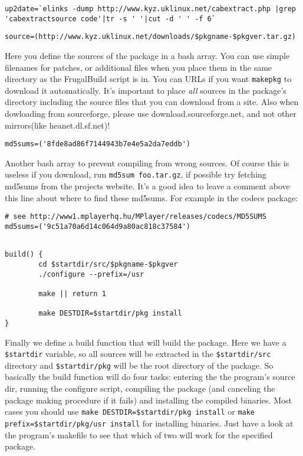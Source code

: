 \begin{verbatim}
up2date=`elinks -dump http://www.kyz.uklinux.net/cabextract.php |grep 'cabextractsource code'|tr -s ' '|cut -d ' ' -f 6`
\end{verbatim}

\begin{verbatim}
source=(http://www.kyz.uklinux.net/downloads/$pkgname-$pkgver.tar.gz)
\end{verbatim}

Here you define the sources of the package in a bash array. You can use simple filenames for patches, or additional files when you place them in the same directory as the FrugalBuild script is in. You can URLs if you want {\tt makepkg} to download it automatically. It's important to place \textit{all} sources in the package's directory including the source files that you can download from a site.
Also when dowloading from sourceforge, please use download.sourceforge.net, and not other mirrors(like
heanet.dl.sf.net)!

\begin{verbatim}
md5sums=('8fde8ad86f7144943b7e4e5a2da7eddb')
\end{verbatim}

Another bash array to prevent compiling from wrong sources. Of course this is useless if you download, run {\tt md5sum foo.tar.gz}, if possible try fetching md5sums from the projects website. It's a good idea to leave a comment above this line about where to find these md5sums. For example in the codecs package:

\begin{verbatim}
# see http://www1.mplayerhq.hu/MPlayer/releases/codecs/MD5SUMS
md5sums=('9c51a70a6d14c064d9a80ac818c37584')
\end{verbatim}

\begin{verbatim}

build() {
        cd $startdir/src/$pkgname-$pkgver
        ./configure --prefix=/usr
	
        make || return 1
	
        make DESTDIR=$startdir/pkg install
}
\end{verbatim}

Finally we define a build function that will build the package. Here we have a {\tt \$startdir} variable, so all sources will be extracted in the {\tt \$startdir/src} directory and {\tt \$startdir/pkg} will be the root directory of the package. So basically the build function will do four tasks: entering the the program's source dir, running the configure script, compiling the package (and canceling the package making procedure if it fails) and installing the compiled binaries. Most cases you should use {\tt make DESTDIR=\$startdir/pkg install} or {\tt make prefix=\$startdir/pkg/usr install} for installing binaries. Just have a look at the program's makefile to see that which of two will work for the specified package.


